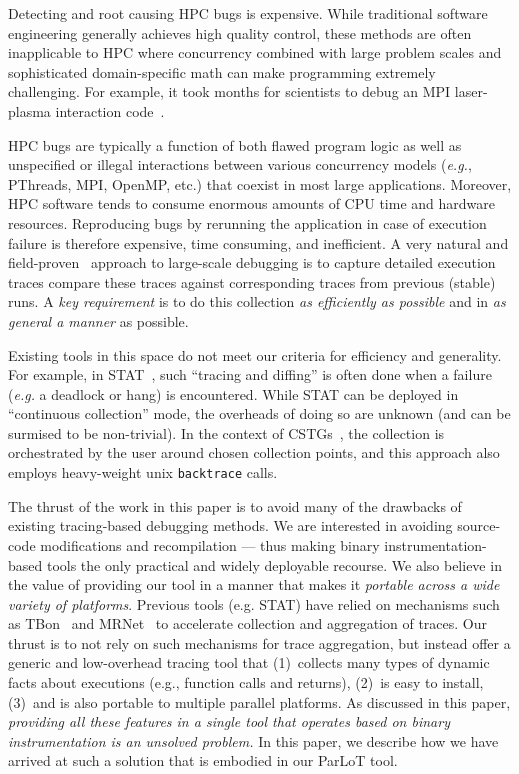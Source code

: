 
Detecting and root causing HPC bugs is expensive. While traditional software engineering generally achieves high quality control, these methods are often inapplicable to HPC where concurrency combined with large problem scales and sophisticated domain-specific math can make programming extremely challenging. For example, it took months for scientists to debug an MPI laser-plasma interaction code~\cite{hpcdoe}.

HPC bugs are typically a function of both flawed program logic as well as unspecified or illegal interactions between various concurrency models ({\em e.g.}, PThreads, MPI, OpenMP, etc.) that coexist in most large applications. Moreover, HPC software tends to consume enormous amounts of CPU time and hardware resources. Reproducing bugs by rerunning the application in case of execution failure is therefore expensive, time consuming, and inefficient. 
A very natural and field-proven~\cite{stat,cstg} approach to large-scale debugging is to
capture detailed execution traces
compare these traces
 against corresponding
 traces from previous (stable) runs.
%
A {\em key requirement} is to do this collection {\em as efficiently as possible}
and in {\em as general a manner} as possible.
%

Existing tools in this space
do not meet our criteria for efficiency and generality.
%
For example, in STAT~\cite{stat}, such ``tracing and diffing'' is often done
when a failure ({\em e.g.} a deadlock or hang) is encountered.
%
While STAT can be deployed in ``continuous collection'' mode, the overheads of
doing so are unknown (and can be surmised to be non-trivial).
%
In the context of CSTGs~\cite{cstg}, the collection is orchestrated by the
user around chosen collection points, and this approach also employs heavy-weight
unix {\tt backtrace} calls.


The thrust of the work in this paper is to avoid many of the drawbacks of existing
tracing-based debugging methods.
%
We are interested in avoiding
source-code modifications and recompilation --- thus making binary
instrumentation-based tools the only practical and widely deployable recourse.
%
We also believe in the value
of providing our tool in a manner that makes it {\em portable across a 
wide variety of platforms}.
%
Previous tools (e.g. STAT) have relied on  mechanisms such as
TBon~\cite{tbon-dorian} and MRNet~\cite{mrnet} to accelerate collection and
aggregation of traces.
%
Our thrust is to not rely on such mechanisms for trace aggregation, but
instead offer 
a generic and low-overhead tracing tool that 
(1)~collects many types of dynamic facts about executions (e.g., function
calls and returns), 
(2)~is easy to install, 
(3)~and is also portable to multiple parallel platforms.
%
As discussed in this paper, {\em providing all these features in a single tool
that operates based on binary instrumentation
is an unsolved problem.}
%
In this paper, we describe how we have arrived at such a solution that is embodied
in our ParLoT tool.



